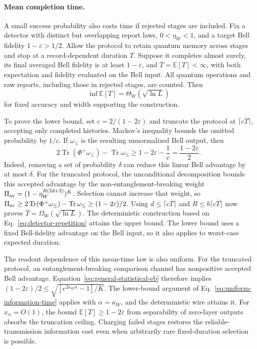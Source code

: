 \documentclass[aps,prl,twocolumn,superscriptaddress,longbibliography,reprint,floatfix]{revtex4-2}
\newcommand{\tr}{\operatorname{Tr}}
\newcommand{\eps}{\varepsilon}
\begin{document}
\paragraph*{Mean completion time.}
A small success probability also costs time if rejected stages are
included. Fix a detector with distinct but overlapping report laws,
$0<\eta_W<1$, and a target Bell fidelity $1-\eps>1/2$.
Allow the protocol to retain quantum memory across stages and stop at
a record-dependent duration $T$. Suppose it completes almost surely,
its final averaged Bell fidelity is at least $1-\eps$, and
$\overline T=\mathbb E[T]<\infty$, with both expectation and fidelity evaluated
on the Bell input. All quantum operations and raw reports, including
those in rejected stages, are counted. Then
\begin{equation}
 \inf\mathbb E[T]=\Theta_W(\sqrt{\ln L})
 \label{eq:mean-completion-time}
\end{equation}
for fixed accuracy and width supporting the construction.

To prove the lower bound, set $c=2/(1-2\eps)$ and truncate the protocol
at $\lceil c\overline T\rceil$, accepting only completed histories. Markov's
inequality bounds the omitted probability by $1/c$. If $\omega_\le$
is the resulting unnormalized Bell output, then
\begin{equation}
 2\tr(\Phi^+\omega_\le)-\tr\omega_\le
 \ge 1-2\eps-\frac1c=\frac{1-2\eps}{2}.
 \label{eq:mean-truncation}
\end{equation}
Indeed, removing a set of probability $\delta$ can reduce this linear
Bell advantage by at most $\delta$. For the truncated protocol, the
unconditional decomposition bounds this accepted advantage by the
non-entanglement-breaking weight
$\Pi_{\rm av}=(1-\eta_W^{R(2d+2)})^K$. Selection cannot increase that weight, so
$\Pi_{\rm av}\ge2\tr(\Phi^+\omega_\le)-\tr\omega_\le\ge(1-2\eps)/2$.
Using $d\le\lceil c\overline T\rceil$ and
$R\le b\lceil c\overline T\rceil$ now proves
$\overline T=\Omega_W(\sqrt{\ln L})$. The deterministic construction based on
Eq.~\eqref{eq:detector-repetition} attains the upper bound. The lower bound uses a fixed Bell-fidelity advantage on the Bell
input, so it also applies to worst-case expected duration.

The readout dependence of this mean-time law is also uniform.
For the truncated protocol, an entanglement-breaking comparison channel
has nonpositive accepted Bell advantage. Equation~\eqref{eq:general-statistical-eb}
therefore implies
$(1-2\eps)/2\le\sqrt{[e^{2\kappa_W n}-1]/K}$.
The lower-bound argument of Eq.~\eqref{eq:uniform-information-time}
applies with $\alpha=\kappa_W$, and the deterministic wire attains it.
For $x_\alpha=O(1)$, the bound $\mathbb E[T]\ge1-2\eps$ from separability
of zero-layer outputs absorbs the truncation ceiling.
Charging failed
stages restores the reliable-transmission information cost even when
arbitrarily rare fixed-duration selection is possible.
\end{document}
